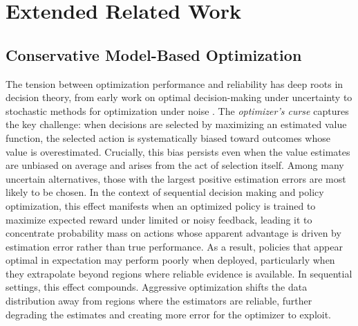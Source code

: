 \section{Extended Related Work}
\label{app:extended_related_work}

\subsection{Conservative Model-Based Optimization}

The tension between optimization performance and reliability has deep roots in decision theory, from early work on optimal decision-making under uncertainty \citep{raiffa1961applied} to stochastic methods for optimization under noise \citep{kushner1964new}. 
The \textit{optimizer's curse} \citep{smith2006optimizer} captures the key challenge: when decisions are selected by maximizing an estimated value function, the selected action is systematically biased toward outcomes whose value is overestimated. 
Crucially, this bias persists even when the value estimates are unbiased on average and arises from the act of selection itself. Among many uncertain alternatives, those with the largest positive estimation errors are most likely to be chosen. 
In the context of sequential decision making and policy optimization, this effect manifests when an optimized policy is trained to maximize expected reward under limited or noisy feedback, leading it to concentrate probability mass on actions whose apparent advantage is driven by estimation error rather than true performance. 
As a result, policies that appear optimal in expectation may perform poorly when deployed, particularly when they extrapolate beyond regions where reliable evidence is available.
In sequential settings, this effect compounds. Aggressive optimization shifts the data distribution away from regions where the estimators are reliable, further degrading the estimates and creating more error for the optimizer to exploit.


